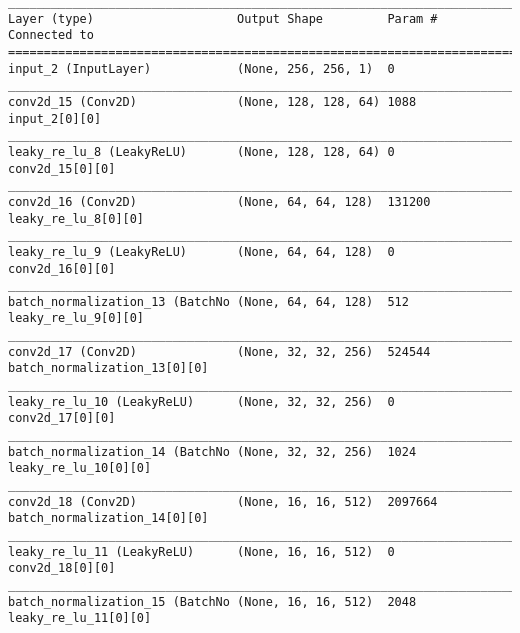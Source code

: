 \begin{verbatim}
__________________________________________________________________________________________________
Layer (type)                    Output Shape         Param #     Connected to                     
==================================================================================================
input_2 (InputLayer)            (None, 256, 256, 1)  0                                            
__________________________________________________________________________________________________
conv2d_15 (Conv2D)              (None, 128, 128, 64) 1088        input_2[0][0]                    
__________________________________________________________________________________________________
leaky_re_lu_8 (LeakyReLU)       (None, 128, 128, 64) 0           conv2d_15[0][0]                  
__________________________________________________________________________________________________
conv2d_16 (Conv2D)              (None, 64, 64, 128)  131200      leaky_re_lu_8[0][0]              
__________________________________________________________________________________________________
leaky_re_lu_9 (LeakyReLU)       (None, 64, 64, 128)  0           conv2d_16[0][0]                  
__________________________________________________________________________________________________
batch_normalization_13 (BatchNo (None, 64, 64, 128)  512         leaky_re_lu_9[0][0]              
__________________________________________________________________________________________________
conv2d_17 (Conv2D)              (None, 32, 32, 256)  524544      batch_normalization_13[0][0]     
__________________________________________________________________________________________________
leaky_re_lu_10 (LeakyReLU)      (None, 32, 32, 256)  0           conv2d_17[0][0]                  
__________________________________________________________________________________________________
batch_normalization_14 (BatchNo (None, 32, 32, 256)  1024        leaky_re_lu_10[0][0]             
__________________________________________________________________________________________________
conv2d_18 (Conv2D)              (None, 16, 16, 512)  2097664     batch_normalization_14[0][0]     
__________________________________________________________________________________________________
leaky_re_lu_11 (LeakyReLU)      (None, 16, 16, 512)  0           conv2d_18[0][0]                  
__________________________________________________________________________________________________
batch_normalization_15 (BatchNo (None, 16, 16, 512)  2048        leaky_re_lu_11[0][0]             

\end{verbatim}
